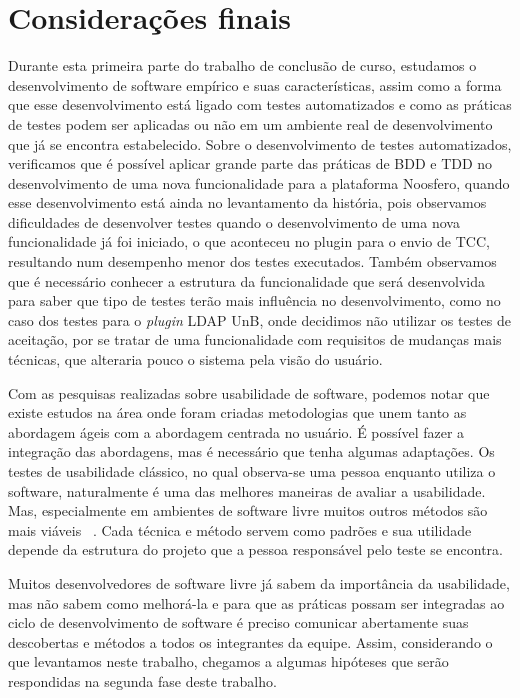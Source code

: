 \chapter{Considerações finais}
\label{consideracoes-finais}

Durante esta primeira parte do trabalho de conclusão de curso, estudamos o desenvolvimento de software empírico e suas características, assim como a forma que esse desenvolvimento está ligado com testes automatizados e como as práticas de testes podem ser aplicadas ou não em um ambiente real de desenvolvimento que já se encontra estabelecido.
%
Sobre o desenvolvimento de testes automatizados, verificamos que é possível aplicar grande parte das práticas de BDD e TDD no desenvolvimento de uma nova funcionalidade para a plataforma Noosfero, quando esse desenvolvimento está ainda no levantamento da história, pois observamos dificuldades de desenvolver testes quando o desenvolvimento de uma nova funcionalidade já foi iniciado, o que aconteceu no plugin para o envio de TCC, resultando num desempenho menor dos testes executados.
%
Também observamos que é necessário conhecer a estrutura da funcionalidade que será desenvolvida para saber que tipo de testes terão mais influência no desenvolvimento, como no caso dos testes para o \textit{plugin} LDAP UnB, onde decidimos não utilizar os testes de aceitação, por se tratar de uma funcionalidade com requisitos de mudanças mais técnicas, que alteraria pouco o sistema pela visão do usuário.

Com as pesquisas realizadas sobre usabilidade de software, podemos notar que existe estudos na área onde foram criadas metodologias que unem tanto as abordagem ágeis com a abordagem centrada no usuário. É possível fazer a integração das abordagens, mas é necessário que tenha algumas adaptações.
%
Os testes de usabilidade clássico, no qual observa-se uma pessoa enquanto utiliza o software, naturalmente é uma das melhores maneiras de avaliar a usabilidade. Mas, especialmente em ambientes de software livre muitos outros métodos são mais viáveis ~\cite{borchardt2011}.
%
Cada técnica e método servem como padrões e sua utilidade depende da estrutura do projeto que a pessoa responsável pelo teste se encontra. 

Muitos desenvolvedores de software livre já sabem da importância da usabilidade, mas não sabem como melhorá-la e para que as práticas possam ser integradas ao ciclo de desenvolvimento de software é preciso comunicar abertamente suas descobertas e métodos a todos os integrantes da equipe.
%
Assim, considerando o que levantamos neste trabalho, chegamos a algumas hipóteses que serão respondidas na segunda fase deste trabalho.

